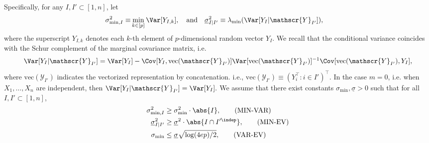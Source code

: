 \documentclass[aos]{imsart}
\begin{document}
Specifically, for any $I, I' \subset [1,n]$, let %
\begin{equation*} \begin{aligned}
    {\sigma}^2_{\min,I} \equiv
    & \min_{k \in [p]} \Var[Y_{I,k}], 
    \quad\mbox{and}\quad
    \underline{\sigma}^2_{I|I'} \equiv
     \lambda_{\min}(\Var[Y_{I}|\mathscr{Y}_{I'}]),
\end{aligned} \end{equation*}
where the superscript $Y_{I,k}$ denotes each $k$-th element of $p$-dimensional random vector $Y_{I}$.
We recall that the conditional variance coincides with the Schur complement of the marginal covariance matrix, i.e.
\begin{equation*}
\begin{aligned}
    \Var[Y_{I}|\mathscr{Y}_{I'}] 
    = \Var[Y_{I}]
    - \Cov[Y_{I}, \mathrm{vec}(\mathscr{Y}_{I'})] \Var[\mathrm{vec}(\mathscr{Y}_{I'})]^{-1} \Cov[\mathrm{vec}(\mathscr{Y}_{I'}), Y_{I}],
\end{aligned}
\end{equation*}
where $\mathrm{vec}(\mathscr{Y}_{I'})$ indicates the vectorized representation by concatenation. i.e., $\mathrm{vec}(\mathscr{Y}_{I'}) \equiv (Y_i^\top: i \in I')^\top$. %
In the case $m=0$, i.e. when $X_1,\dots,X_n$ are independent, then 
$\Var[Y_{I}|\mathscr{Y}_{I'}] = \Var[Y_{I}].$
We assume that there exist constants $\sigma_{\min}, \underline{\sigma} > 0$ such that 
for all $I, I' \subset [1,n]$,
\begin{align}
    \sigma^2_{\min,I} & \geq \sigma^2_{\min} \cdot \abs{I}, 
    \label{assmp:min_var} \tag{MIN-VAR} \\
    \underline{\sigma}^2_{I|I'} & \geq \underline{\sigma}^2 \cdot \abs{I \cap I'^{\indep}}, 
    \label{assmp:min_ev} \tag{MIN-EV} \\
    \sigma_{\min} & \le \underline{\sigma} \sqrt{\log(4ep)/2},
    \label{assmp:var_ev}\tag{VAR-EV}
\end{align}
\end{document}
